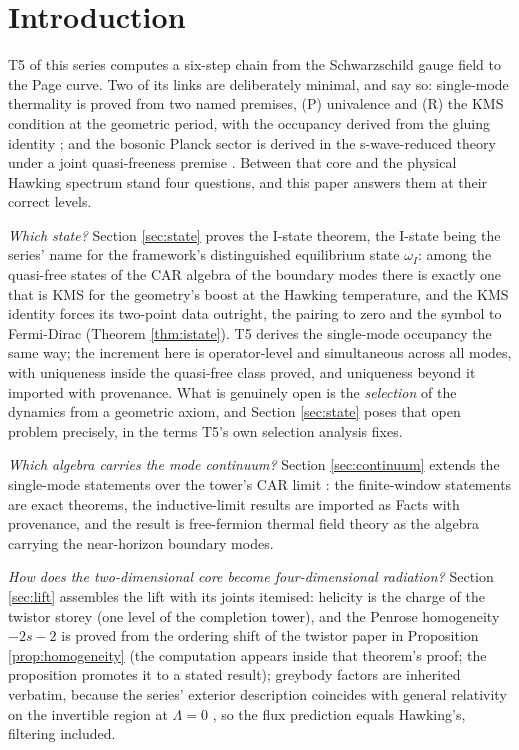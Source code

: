 \newpage
\section{Introduction}\label{sec:intro}

T5 of this series \cite{ButlerT5} computes a six-step chain from the Schwarzschild gauge field to the Page curve. Two of its links are deliberately minimal, and say so: single-mode thermality is proved from two named premises, (P) univalence and (R) the KMS condition at the geometric period, with the occupancy derived from the gluing identity \cite[Prems.~7.8 and 7.19, Thm.~7.20]{ButlerT5}; and the bosonic Planck sector is derived in the s-wave-reduced theory under a joint quasi-freeness premise \cite[Prem.~8.1]{ButlerT5}. Between that core and the physical Hawking spectrum stand four questions, and this paper answers them at their correct levels.

\emph{Which state?} Section \ref{sec:state} proves the I-state theorem, the I-state being the series' name for the framework's distinguished equilibrium state $\omega_I$: among the quasi-free states of the CAR algebra of the boundary modes there is exactly one that is KMS for the geometry's boost at the Hawking temperature, and the KMS identity forces its two-point data outright, the pairing to zero and the symbol to Fermi-Dirac (Theorem \ref{thm:istate}). T5 derives the single-mode occupancy the same way; the increment here is operator-level and simultaneous across all modes, with uniqueness inside the quasi-free class proved, and uniqueness beyond it imported with provenance. What is genuinely open is the \emph{selection} of the dynamics from a geometric axiom, and Section \ref{sec:state} poses that open problem precisely, in the terms T5's own selection analysis fixes.

\emph{Which algebra carries the mode continuum?} Section \ref{sec:continuum} extends the single-mode statements over the tower's CAR limit \cite{ButlerT3}: the finite-window statements are exact theorems, the inductive-limit results are imported as Facts with provenance, and the result is free-fermion thermal field theory as the algebra carrying the near-horizon boundary modes.

\emph{How does the two-dimensional core become four-dimensional radiation?} Section \ref{sec:lift} assembles the lift with its joints itemised: helicity is the charge of the twistor storey (one level of the completion tower), and the Penrose homogeneity $-2s-2$ is proved from the ordering shift of the twistor paper \cite[Thm.~5.7]{ButlerT9} in Proposition \ref{prop:homogeneity} (the computation appears inside that theorem's proof; the proposition promotes it to a stated result); greybody factors are inherited verbatim, because the series' exterior description coincides with general relativity on the invertible region at $\Lambda = 0$ \cite{ButlerT6}, so the flux prediction equals Hawking's, filtering included.

